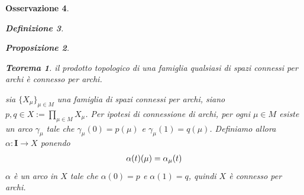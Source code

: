 \documentclass[oneside, 11pt]{amsbook}
\makeatletter
\newcommand{\0}{{(0)}}
\newcommand{\3}{{(3)}}
\theoremstyle{colonplain}
\newtheorem{thm}{Teorema}[chapter]
\newtheorem{prop}[thm]{Proposizione}
\theoremstyle{colondefinition}
\newtheorem{defn}[thm]{Definizione}
\theoremstyle{colonremark}
\newtheorem{rmk}[thm]{Osservazione}
\numberwithin{equation}{chapter}
\renewcommand{\proofname}{Dimostrazione}
\renewenvironment{proof}[1][\proofname]{\par
  \pushQED{\end{proof}}%
  \normalfont \topsep6\p@\@plus6\p@\relax
  \trivlist
  \item[\hskip\labelsep\bfseries #1:]\ignorespaces
}{%
  \popQED\endtrivlist\@endpefalse
}
\makeatother
\begin{document}
\begin{rmk}
\begin{defn}
\begin{prop}
\begin{thm}
il prodotto topologico di una famiglia qualsiasi di spazi connessi per archi è connesso per archi.
\end{thm}
\begin{proof}
sia $\{ X_\mu \}_{\mu \in M}$ una famiglia di spazi connessi per archi, siano $p, q \in X := \prod_{\mu \in M} X_\mu$. Per ipotesi di connessione di archi, per ogni $\mu \in M$ esiste un arco $\gamma_\mu$ tale che $\gamma_\mu(0) = p(\mu)$ e $\gamma_\mu(1) = q(\mu)$. Definiamo allora $\alpha : \mathbf{I} \longrightarrow X$ ponendo
\begin{align}
    \alpha(t)(\mu) = \alpha_\mu(t) \notag
\end{align}
$\alpha$ è un arco in $X$ tale che $\alpha(0) = p$ e $\alpha(1) = q$, quindi $X$ è connesso per archi.
\end{proof}


\end{prop}
\end{defn}
\end{rmk}
\end{document}
